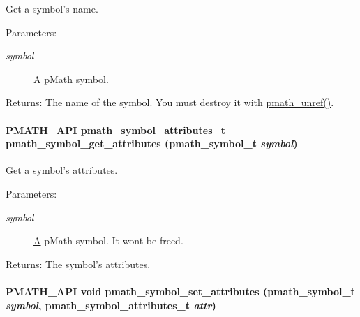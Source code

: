 Get a symbol's name. 

\begin{Desc}
\item[Parameters:]
\begin{description}
\item[{\em symbol}]\hyperlink{class_a}{A} pMath symbol. \end{description}
\end{Desc}
\begin{Desc}
\item[Returns:]The name of the symbol. You must destroy it with \hyperlink{classpmath__t_54e905402c38940687033b87eb8c6c9f}{pmath\_\-unref()}. \end{Desc}
\hypertarget{group__symbols_gd553b66226a31e4c105b4f3c93682284}{
\paragraph[{pmath\_\-symbol\_\-get\_\-attributes}]{\setlength{\rightskip}{0pt plus 5cm}PMATH\_\-API {\bf pmath\_\-symbol\_\-attributes\_\-t} pmath\_\-symbol\_\-get\_\-attributes ({\bf pmath\_\-symbol\_\-t} {\em symbol})}\hfill}
\label{group__symbols_gd553b66226a31e4c105b4f3c93682284}


Get a symbol's attributes. 

\begin{Desc}
\item[Parameters:]
\begin{description}
\item[{\em symbol}]\hyperlink{class_a}{A} pMath symbol. It wont be freed. \end{description}
\end{Desc}
\begin{Desc}
\item[Returns:]The symbol's attributes. \end{Desc}
\hypertarget{group__symbols_g37c740a2074440f4364763a4dbfab931}{
\paragraph[{pmath\_\-symbol\_\-set\_\-attributes}]{\setlength{\rightskip}{0pt plus 5cm}PMATH\_\-API void pmath\_\-symbol\_\-set\_\-attributes ({\bf pmath\_\-symbol\_\-t} {\em symbol}, \/  {\bf pmath\_\-symbol\_\-attributes\_\-t} {\em attr})}\hfill}
\label{group__symbols_g37c740a2074440f4364763a4dbfab931}


